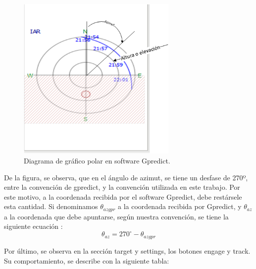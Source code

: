 \begin{figure}[ht]
	\centering
	\includegraphics[height=8cm]{polar_plot}
	\caption{Diagrama de gráfico polar en software Gpredict.} 
	\label{fig:polar_plot_expl}
\end{figure}

De la figura, se observa, que en el ángulo de azimut, se tiene un desfase de 270º, entre la convención de gpredict, y la convención utilizada en este trabajo. Por este motivo, a la coordenada recibida por el software Gpredict, debe restársele esta cantidad. Si denominamos $\theta_{azgpr}$ a la coordenada recibida por Gpredict, y $\theta_{az}$ a la coordenada que debe apuntarse, según nuestra convención, se tiene la siguiente ecuación :
\begin{equation}
	\theta_{az} =270^\circ - \theta_{azgpr}
\end{equation}

Por último, se observa en la sección target y settings, los botones engage y track. Su comportamiento, se describe con la siguiente tabla: 

